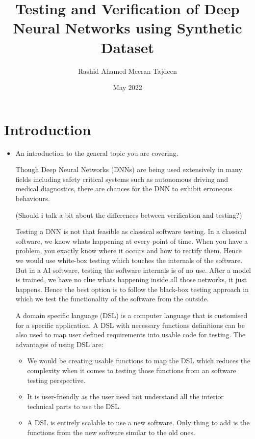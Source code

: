 \documentclass[rnd]{mas_proposal}
\title{Testing and Verification of Deep Neural Networks using Synthetic Dataset}
\author{Rashid Ahamed Meeran Tajdeen}
\date{May 2022}
\begin{document}
\maketitle

\pagestyle{plain}

\section{Introduction}
\begin{itemize}
    \item An introduction to the general topic you are covering.
    
    Though Deep Neural Networks (DNNs) are being used extensively in many fields including safety critical systems such as autonomous driving and medical diagnostics, there are chances for the DNN to exhibit erroneous behaviours.
    
    (Should i talk a bit about the differences between verification and testing?)
    
    Testing a DNN is not that feasible as classical software testing. In a classical software, we know whats happening at every point of time. When you have a problem, you exactly know where it occurs and how to rectify them. Hence we would use white-box testing which touches the internals of the software. But in a AI software, testing the software internals is of no use. After a model is trained, we have no clue whats happening inside all those networks, it just happens. Hence the best option is to follow the black-box testing approach in which we test the functionality of the software from the outside.
    
    A domain specific language (DSL) is a computer language that is customised for a specific application. A DSL with necessary functions definitions can be also used to map user defined requirements into usable code for testing. The advantages of using DSL are:
    \begin{itemize}
        \item We would be creating usable functions to map the DSL which reduces the complexity when it comes to testing those functions from an software testing perspective.
        \item It is user-friendly as the user need not understand all the interior technical parts to use the DSL.
        \item A DSL is entirely scalable to use a new software. Only thing to add is the functions from the new software similar to the old ones.
    \end{itemize}
    

\end{itemize}
\end{document}
